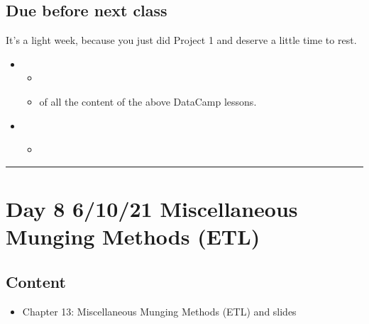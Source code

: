 \documentclass[letterpaper,10pt,english]{jupyterBook}
\begin{document}
\subsection{Due before next class}
\label{\detokenize{course-schedule:id12}}
\sphinxAtStartPar
It’s a light week, because you just did Project 1 and deserve a little time to rest.
\begin{itemize}
\item {} 
\sphinxAtStartPar
{}
\begin{itemize}
\item {} 
\sphinxAtStartPar
{}

\item {} 
\sphinxAtStartPar
{} of all the content of the above DataCamp lessons.

\end{itemize}

\item {} 
\sphinxAtStartPar
{}
\begin{itemize}
\item {} 
\sphinxAtStartPar
{\hyperref[\detokenize{chapter-13-etl::doc}]{}}

\end{itemize}

\end{itemize}


\bigskip\hrule\bigskip



\section{Day 8 \sphinxhyphen{} 6/10/21 \sphinxhyphen{} Miscellaneous Munging Methods (ETL)}
\label{\detokenize{course-schedule:day-8-6-10-21-miscellaneous-munging-methods-etl}}

\subsection{Content}
\label{\detokenize{course-schedule:id13}}\begin{itemize}
\item {} 
\sphinxAtStartPar
Chapter 13: Miscellaneous Munging Methods (ETL) \sphinxhyphen{} {\hyperref[\detokenize{chapter-13-etl::doc}]{}} and slides

\end{itemize}
\end{document}
